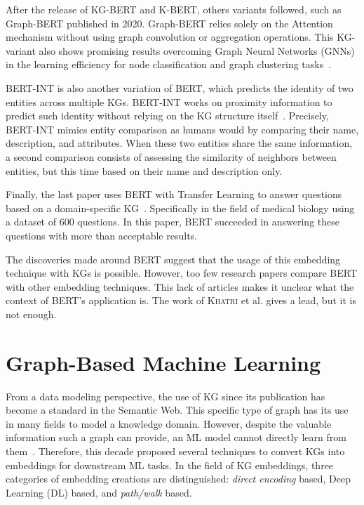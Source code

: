 After the release of KG-BERT and K-BERT, others variants followed, such as
Graph-BERT published in 2020. Graph-BERT relies solely on the Attention
mechanism without using graph convolution or aggregation operations. This
KG-variant also shows promising results overcoming Graph Neural Networks (GNNs)
in the learning efficiency for node classification and graph clustering
tasks~\citep{zhang}.

BERT-INT is also another variation of BERT, which predicts the identity of two
entities across multiple KGs. BERT-INT works on proximity information to predict
such identity without relying on the KG structure
itself~\citep{DBLP:conf/ijcai/Tang0C00L20}. Precisely, BERT-INT mimics entity
comparison as humans would by comparing their name, description, and
attributes. When these two entities share the same information, a second
comparison consists of assessing the similarity of neighbors between entities,
but this time based on their name and description only.

Finally, the last paper uses BERT with Transfer Learning to answer questions
based on a domain-specific KG~\citep{DBLP:conf/aics/VegupattiNC20}. Specifically
in the field of medical biology using a dataset of 600 questions. In this paper,
BERT succeeded in answering these questions with more than acceptable results.

The discoveries made around BERT suggest that the usage of this embedding
technique with KGs is possible. However, too few research papers compare BERT
with other embedding techniques. This lack of articles makes it unclear what the
context of BERT's application is. The work of \textsc{Khatri} et al. gives a
lead, but it is not enough.

\section{Graph-Based Machine Learning}
\label{section:related:work:graph}

From a data modeling perspective, the use of KG since its publication has become
a standard in the Semantic Web. This specific type of graph has its use in many
fields to model a knowledge domain. However, despite the valuable information
such a graph can provide, an ML model cannot directly learn from
them~\citep{article:ristoski:rdf2vec}. Therefore, this decade proposed several
techniques to convert KGs into embeddings for downstream ML tasks. In the field
of KG embeddings, three categories of embedding creations are distinguished:
\emph{direct encoding} based, Deep Learning (DL) based, and \emph{path/walk}
based.

